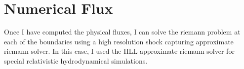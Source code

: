 \section{Numerical Flux}

Once I have computed the physical fluxes, I can solve the riemann problem at each of the boundaries using a high resolution shock capturing approximate riemann solver. In this case, I used the HLL approximate riemann solver for special relativistic hydrodynamical simulations.
